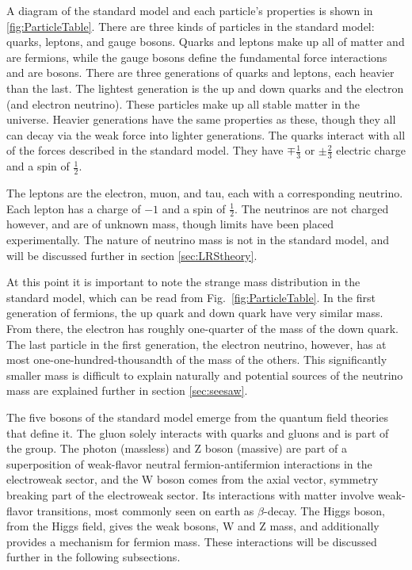 A diagram of the standard model and each particle's properties is shown in \ref{fig:ParticleTable}.  There are three kinds of particles in the standard model: quarks, leptons, and gauge bosons.  Quarks and leptons make up all of matter and are fermions, while the gauge bosons define the fundamental force interactions and are bosons. There are three generations of quarks and leptons, each heavier than the last.  The lightest generation is the up and down quarks and the electron (and electron neutrino). These particles make up all stable matter in the universe.  Heavier generations have the same properties as these, though they all can decay via the weak force into lighter generations. 
The quarks interact with all of the forces described in the standard model.  They have \ensuremath{\mp\frac{1}{3}} or \ensuremath{\pm\frac{2}{3}} electric charge and a spin of \ensuremath{\frac{1}{2}}.

The leptons are the electron, muon, and tau, each with a corresponding neutrino.  Each lepton has a charge of \ensuremath{-1} and a spin of \ensuremath{\frac{1}{2}}.  The neutrinos are not charged however, and are of unknown mass, though limits have been placed experimentally.  The nature of neutrino mass is not in the standard model, and will be discussed further in section \ref{sec:LRStheory}.

At this point it is important to note the strange mass distribution in the standard model, which can be read from Fig.~\ref{fig:ParticleTable}. In the first generation of fermions, the up quark and down quark have very similar mass.  From there, the electron has roughly one-quarter of the mass of the down quark. The last particle in the first generation, the electron neutrino, however, has at most one-one-hundred-thousandth of the mass of the others. This significantly smaller mass is difficult to explain naturally and potential sources of the neutrino mass are explained further in section \ref{sec:seesaw}.  

The five bosons of the standard model emerge from the quantum field theories that define it.  The gluon solely interacts with quarks and gluons and is part of the \SUthree group.  The photon (massless) and Z boson (massive) are part of a superposition of weak-flavor neutral fermion-antifermion interactions in the electroweak sector, and the W boson comes from the axial vector, symmetry breaking part of the electroweak sector.  Its interactions with matter involve weak-flavor transitions, most commonly seen on earth as \ensuremath{\beta}-decay. The Higgs boson, from the Higgs field, gives the weak bosons, W and Z mass, and additionally provides a mechanism for fermion mass.  These interactions will be discussed further in the following subsections.


